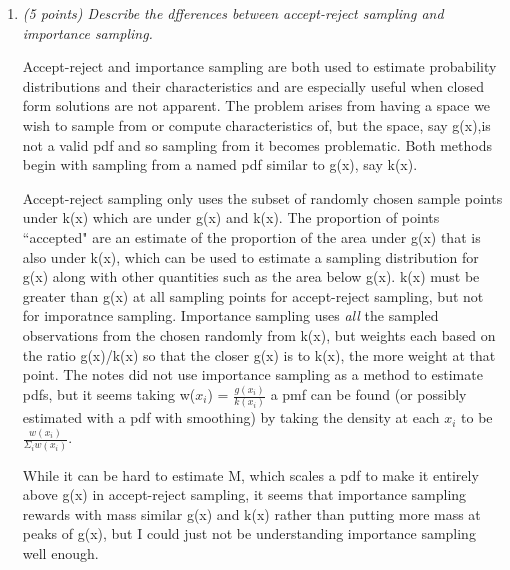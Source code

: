 \documentclass{article}\usepackage[]{graphicx}\usepackage[]{color}
\newenvironment{knitrout}{}{} %
\begin{document}
\begin{enumerate}
\item%
{\it (5 points) Describe the dfferences between accept-reject sampling and importance sampling.}

Accept-reject and importance sampling are both used to estimate probability distributions and their characteristics and are especially useful when closed form solutions are not apparent. The problem arises from having a space we wish to sample from or compute characteristics of, but the space, say g(x),is not a valid pdf and so sampling from it becomes problematic. Both methods begin with sampling from a named pdf similar to g(x), say k(x). 

Accept-reject sampling only uses the subset of randomly chosen sample points under k(x) which are under g(x) and k(x). The proportion of points ``accepted" are an estimate of the proportion of the area under g(x) that is also under k(x), which can be used to estimate a sampling distribution for g(x) along with other quantities such as the area below g(x). k(x) must be greater than g(x) at all sampling points for accept-reject sampling, but not for imporatnce sampling. Importance sampling uses {\it all} the sampled observations from the chosen randomly from k(x), but weights each based on the ratio g(x)/k(x) so that the closer g(x) is to k(x), the more weight at that point. The notes did not use importance sampling as a method to estimate pdfs, but it seems taking w($x_{i}$) = $\frac{g(x_{i})}{k(x_{i})}$ a pmf can be found (or possibly estimated with a pdf with smoothing) by taking the density at each $x_{i}$ to be $\frac{w(x_{i})}{\Sigma_{i} w(x_{i})}$.

While it can be hard to estimate M, which scales a pdf to make it entirely above g(x) in accept-reject sampling, it seems that importance sampling rewards with mass similar g(x) and k(x) rather than putting more mass at peaks of g(x), but I could just not be understanding importance sampling well enough.

\begin{knitrout}
\color{fgcolor}


\end{knitrout}
\end{enumerate}
\end{document}
